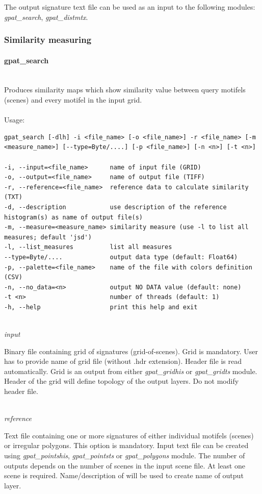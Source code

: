 \documentclass[12pt,margin=0.5in]{article}
\newcommand{\newparagraph}[1]{\paragraph{#1}\mbox{}\\}
\newcommand{\newoption}[1]{\mbox{}\\{\it #1}}
\begin{document}
The output signature text file can be used as an input to the following modules: {\it gpat\_search}, {\it gpat\_distmtx}.

\subsubsection{Similarity measuring}

\newparagraph{gpat\_search}
Produces similarity maps which show similarity value between query motifels (scenes) and every motifel in the input grid.
\\\\
Usage:

\begin{minipage}{\linewidth}
\begin{lstlisting}
gpat_search [-dlh] -i <file_name> [-o <file_name>] -r <file_name> [-m <measure_name>] [--type=Byte/....] [-p <file_name>] [-n <n>] [-t <n>]

-i, --input=<file_name>      name of input file (GRID)
-o, --output=<file_name>     name of output file (TIFF)
-r, --reference=<file_name>  reference data to calculate similarity (TXT)
-d, --description            use description of the reference histogram(s) as name of output file(s)
-m, --measure=<measure_name> similarity measure (use -l to list all measures; default 'jsd')
-l, --list_measures          list all measures
--type=Byte/....             output data type (default: Float64)
-p, --palette=<file_name>    name of the file with colors definition (CSV)
-n, --no_data=<n>            output NO DATA value (default: none)
-t <n>                       number of threads (default: 1)
-h, --help                   print this help and exit
\end{lstlisting}
\end{minipage}

\newoption{input}

Binary file containing grid of signatures (grid-of-scenes). Grid is mandatory. User has to provide name of grid file (without .hdr extension). Header file is read automatically. Grid is an output from either {\it gpat\_gridhis} or {\it gpat\_gridts} module. Header of the grid will define topology of the output layers. Do not modify header file.

\newoption{reference}

Text file containing one or more signatures of either individual motifels (scenes) or irregular polygons. This option is mandatory. Input text file can be created using {\it gpat\_pointshis}, {\it gpat\_pointsts} or {\it gpat\_polygons} module. The number of outputs depends on the number of scenes in the input scene file. At least one scene is required. Name/description of  will be used to create name of output layer. 
\end{document}
